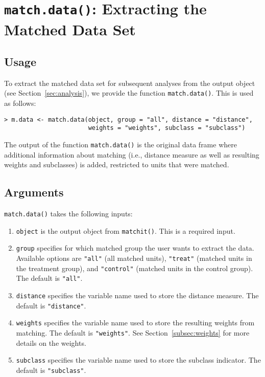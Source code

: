 \section{\texttt{match.data()}: Extracting the Matched Data Set}
\label{sec:match.data}

\subsection{Usage}

To extract the matched data set for subsequent analyses from the
output object (see Section~\ref{sec:analysis}), we provide the
function {\tt match.data()}.  This is used as follows:

\begin{verbatim}
> m.data <- match.data(object, group = "all", distance = "distance", 
                       weights = "weights", subclass = "subclass")
\end{verbatim}

The output of the function {\tt match.data()} is the original data
frame where additional information about matching (i.e., distance
measure as well as resulting weights and subclasses) is added,
restricted to units that were matched.

\subsection{Arguments}

{\tt match.data()} takes the following inputs:
\begin{enumerate}
\item {\tt object} is the output object from {\tt matchit()}. This is
  a required input.
\item {\tt group} specifies for which matched group the user wants to
  extract the data. Available options are {\tt "all"} (all matched
  units), {\tt "treat"} (matched units in the treatment group), and
  {\tt "control"} (matched units in the control group). The default is
  {\tt "all"}.
\item {\tt distance} specifies the variable name used to store the
  distance measure. The default is {\tt "distance"}.
\item {\tt weights} specifies the variable name used to store the
  resulting weights from matching. The default is {\tt "weights"}. See
  Section~\ref{subsec:weights} for more details on the weights.
\item {\tt subclass} specifies the variable name used to store the
  subclass indicator. The default is {\tt "subclass"}.
\end{enumerate}

